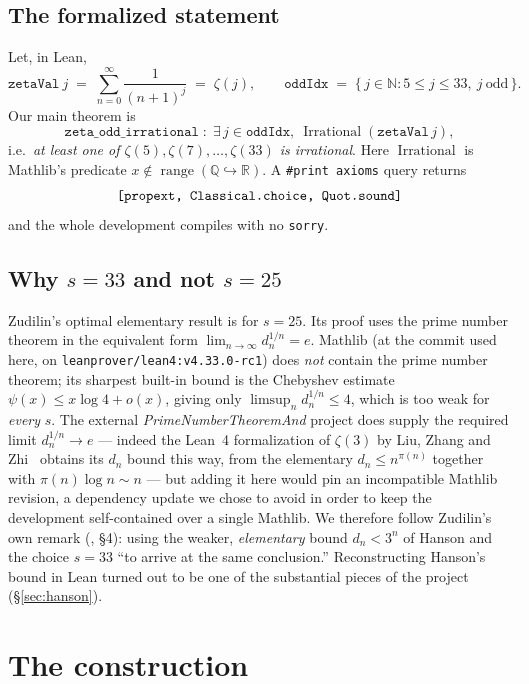 \documentclass[11pt]{article}
\theoremstyle{definition}
\newcommand{\Q}{\mathbb{Q}}
\newcommand{\R}{\mathbb{R}}
\newcommand{\N}{\mathbb{N}}
\newcommand{\code}[1]{\texttt{#1}}
\begin{document}
\subsection*{The formalized statement}

Let, in Lean,
\[
  \code{zetaVal}\ j \;=\; \sum_{n=0}^{\infty}\frac{1}{(n+1)^{j}}
  \;=\;\zeta(j),\qquad
  \code{oddIdx}\;=\;\{\,j\in\N : 5\le j\le 33,\ j\ \text{odd}\,\}.
\]
Our main theorem is
\begin{equation}\label{eq:main}
  \code{zeta\_odd\_irrational} \;:\;
  \exists\, j\in\code{oddIdx},\ \operatorname{Irrational}(\code{zetaVal}\,j),
\end{equation}
i.e.\ \emph{at least one of $\zeta(5),\zeta(7),\dots,\zeta(33)$ is
irrational}. Here $\operatorname{Irrational}$ is Mathlib's predicate
$x\notin\operatorname{range}(\Q\hookrightarrow\R)$. A \code{\#print axioms}
query returns
\[
  \text{\code{[propext, Classical.choice, Quot.sound]}}
\]
and the whole development compiles with no \code{sorry}.

\subsection*{Why $s=33$ and not $s=25$}

Zudilin's optimal elementary result is for $s=25$. Its proof uses the prime
number theorem in the equivalent form $\lim_{n\to\infty}d_n^{1/n}=e$. Mathlib
(at the commit used here, on \code{leanprover/lean4:v4.33.0-rc1}) does
\emph{not} contain the prime number theorem; its sharpest built-in bound is the
Chebyshev estimate $\psi(x)\le x\log 4+o(x)$, giving only
$\limsup_n d_n^{1/n}\le 4$, which is too weak for \emph{every} $s$. The
external \emph{PrimeNumberTheoremAnd} project does supply the required limit
$d_n^{1/n}\to e$ --- indeed the Lean~4 formalization of $\zeta(3)$ by Liu, Zhang
and Zhi~\cite{LiuZhangZhi2025} obtains its $d_n$ bound this way, from the
elementary $d_n\le n^{\pi(n)}$ together with $\pi(n)\log n\sim n$ --- but adding
it here would pin an incompatible Mathlib revision, a dependency update we chose
to avoid in order to keep the development self-contained over a single Mathlib.
We therefore follow Zudilin's own remark (\cite{Zudilin2018}, \S4): using the
weaker, \emph{elementary} bound $d_n<3^n$ of Hanson \cite{Hanson1972} and the
choice $s=33$ ``to arrive at the same conclusion.'' Reconstructing Hanson's
bound in Lean turned out to be one of the substantial pieces of the project
(\S\ref{sec:hanson}).

\section{The construction}\label{sec:construction}
\end{document}
